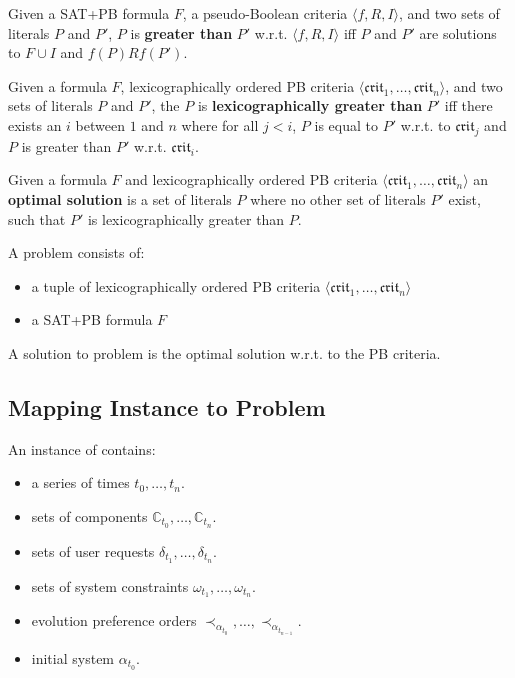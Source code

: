\begin{defs}
Given a SAT+PB formula $F$, a pseudo-Boolean criteria $\langle f,R, I \rangle$, and two sets of literals $P$ and $P'$, 
$P$ is \textbf{greater than}  $P'$ w.r.t. $\langle f,R, I \rangle$
iff $P$ and $P'$ are solutions to $F \cup I$ and $f(P) R f(P')$.
\end{defs}

\begin{defs}
Given a formula $F$, lexicographically ordered PB criteria $\langle \mathfrak{crit}_1,\ldots,\mathfrak{crit}_n \rangle$, and two sets of literals $P$ and $P'$,
the $P$ is \textbf{lexicographically greater than} $P'$
iff there exists an $i$ between $1$ and $n$ where for all $j < i$, $P$ is equal to $P'$ w.r.t. to $\mathfrak{crit}_j$ and $P$ is greater than $P'$ w.r.t. $\mathfrak{crit}_i$.
\end{defs}

\begin{defs}
Given a formula $F$ and lexicographically ordered PB criteria $\langle \mathfrak{crit}_1,\ldots,\mathfrak{crit}_n \rangle$
an \textbf{optimal solution} is a set of literals $P$ where no other set of literals $P'$ exist, such that $P'$ is lexicographically greater than $P$. 
\end{defs}

A \modelimpl problem consists of:
\begin{itemize}
  \item a tuple of lexicographically ordered PB criteria $\langle \mathfrak{crit}_1,\ldots,\mathfrak{crit}_n \rangle$
  \item a SAT+PB formula $F$
\end{itemize}
A solution to \modelimpl problem is the optimal solution w.r.t. to the PB criteria.

\subsection{Mapping \modelname Instance to \modelimpl Problem}
\label{impl.mapping}
An instance of \modelname contains:
\begin{itemize}
  \item a series of times $t_0,\ldots,t_n$.
  \item sets of components $\mathbb{C}_{t_0},\ldots,\mathbb{C}_{t_n}$.
  \item sets of user requests $\delta_{t_1},\ldots,\delta_{t_n}$.
  \item sets of system constraints $\omega_{t_1},\ldots,\omega_{t_n}$.
  \item evolution preference orders $\prec_{\alpha_{t_0}},\ldots, \prec_{\alpha_{t_{n-1}}}$.
  \item initial system $\alpha_{t_0}$.
\end{itemize}

